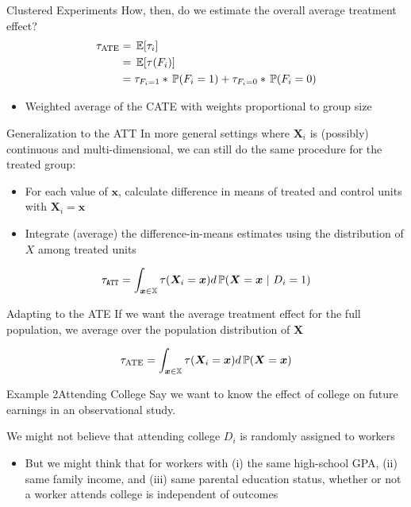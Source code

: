 \documentclass[aspectratio=169,t,11pt,table]{beamer}
\begin{document}
\begin{frame}{Clustered Experiments}
  How, then, do we estimate the overall average treatment effect? 
  \begin{align*}
    \tau_{\text{ATE}} 
    &= \expec{\tau_i} \\
    &= \expec{\tau(F_i)} \\
    &= \tau_{F_i = 1} * \prob{F_i = 1} + \tau_{F_i = 0} * \prob{F_i = 0}
  \end{align*}
  \begin{itemize}
    \item Weighted average of the CATE with weights proportional to group size
  \end{itemize}
\end{frame}

\begin{frame}{Generalization to the ATT}
  In more general settings where $\bm{X}_i$ is (possibly) continuous and multi-dimensional, we can still do the same procedure for the treated group:
  \begin{itemize}
    \item For each value of $\bm{x}$, calculate difference in means of treated and control units with $\bm{X}_i = \bm{x}$
    
    \item Integrate (average) the difference-in-means estimates using the distribution of $X$ among treated units
  \end{itemize}

  \pause
  \vspace*{-\medskipamount}
  $$
    \tau_{\texttt{ATT}} =
    \int_{\bm{x} \in \mathbb{X}} \tau(\bm{X}_i = \bm{x}) d\prob{\bm{X} = \bm{x}}{D_i = 1}
  $$
  
\end{frame}

\begin{frame}{Adapting to the ATE}
  If we want the average treatment effect for the full population, we average over the population distribution of $\bm{X}$
  
  \vspace*{-\medskipamount}
  $$
    \tau_{\text{ATE}} =
    \int_{\bm{x} \in \mathbb{X}} \tau(\bm{X}_i = \bm{x}) d\prob{\bm{X} = \bm{x}}
  $$
\end{frame}

\begin{frame}{Example 2}{Attending College}
  Say we want to know the effect of college on future earnings in an observational study. 
  
  \bigskip
  We might not believe that attending college $D_i$ is randomly assigned to workers
  \begin{itemize}
    \item But we might think that for workers with (i) the same high-school GPA, (ii) same family income, and (iii) same parental education status, whether or not a worker attends college is independent of outcomes
  \end{itemize}
\end{frame}
\end{document}
